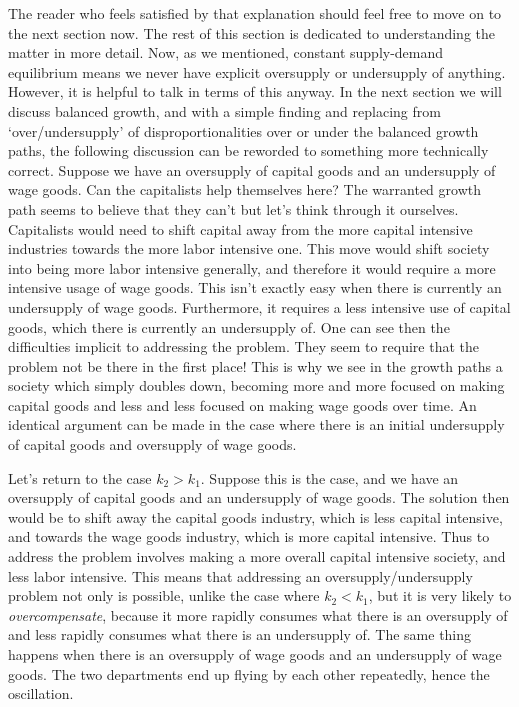 \documentclass{article}
\theoremstyle{theorem}
\begin{document}
The reader who feels satisfied by that explanation should feel free to move on to the next section now. The rest of this section is dedicated to understanding the matter in more detail. Now, as we mentioned, constant supply-demand equilibrium means we never have explicit oversupply or undersupply of anything. However, it is helpful to talk in terms of this anyway. In the next section we will discuss balanced growth, and with a simple finding and replacing from `over/undersupply' of disproportionalities over or under the balanced growth paths, the following discussion can be reworded to something more technically correct. Suppose we have an oversupply of capital goods and an undersupply of wage goods. Can the capitalists help themselves here? The warranted growth path seems to believe that they can't but let's think through it ourselves. Capitalists would need to shift capital away from the more capital intensive industries towards the more labor intensive one. This move would shift society into being more labor intensive generally, and therefore it would require a more intensive usage of wage goods. This isn't exactly easy when there is currently an undersupply of wage goods. Furthermore, it requires a less intensive use of capital goods, which there is currently an undersupply of. One can see then the difficulties implicit to addressing the problem. They seem to require that the problem not be there in the first place! This is why we see in the growth paths a society which simply doubles down, becoming more and more focused on making capital goods and less and less focused on making wage goods over time. An identical argument can be made in the case where there is an initial undersupply of capital goods and oversupply of wage goods. \par 
Let's return to the case $k_2 > k_1$. Suppose this is the case, and we have an oversupply of capital goods and an undersupply of wage goods. The solution then would be to shift away the capital goods industry, which is less capital intensive, and towards the wage goods industry, which is more capital intensive. Thus to address the problem involves making a more overall capital intensive society, and less labor intensive. This means that addressing an oversupply/undersupply problem not only is possible, unlike the case where $k_2 < k_1$, but it is very likely to \emph{overcompensate}, because it more rapidly consumes what there is an oversupply of and less rapidly consumes what there is an undersupply of. The same thing happens when there is an oversupply of wage goods and an undersupply of wage goods. The two departments end up flying by each other repeatedly, hence the oscillation. \par 
\end{document}
